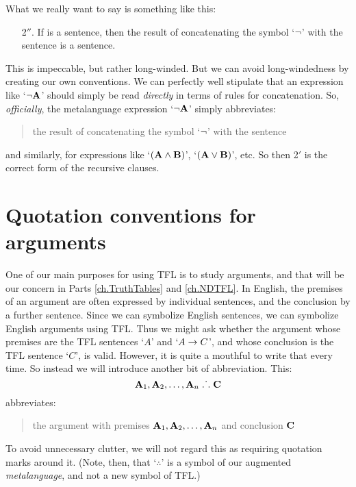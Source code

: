 What we really want to say is something like this:
	\begin{enumerate}
		\item[2$''$.] If  is a sentence, then the result of concatenating the symbol `$\neg$' with the sentence  is a sentence.
	\end{enumerate}
This is impeccable, but rather long-winded. %
But we can avoid long-windedness by creating our own conventions. We can perfectly well stipulate that an expression like `$\neg \mathbf{A}$' should simply be read \emph{directly} in terms of rules for concatenation. So, \emph{officially}, the metalanguage expression `$\neg \mathbf{A}$'
simply abbreviates:
\begin{quote}
	the result of concatenating the symbol `$\neg$' with the sentence 
\end{quote}
and similarly, for expressions like `$(\mathbf{A} \wedge \mathbf{B})$', `$(\mathbf{A} \vee \mathbf{B})$', etc. So then 2$'$ is the correct form of the recursive clauses. 


\section{Quotation conventions for arguments}
One of our main purposes for using TFL is to study arguments, and that will be our concern in Parts \ref{ch.TruthTables} and \ref{ch.NDTFL}. In English, the premises of an argument are often expressed by individual sentences, and the conclusion by a further sentence. Since we can symbolize English sentences, we can symbolize English arguments using TFL. Thus we might ask whether the argument whose premises are the TFL sentences `$A$' and `$A \rightarrow C$', and whose conclusion is the TFL sentence `$C$', is valid. However, it is quite a mouthful to write that every time. So instead we will introduce another bit of abbreviation. This:
	$$\mathbf{A}_1, \mathbf{A}_2, \ldots, \mathbf{A}_n \mathrel{\ldotp\dot{}\,\ldotp} \mathbf{C}$$
abbreviates:
	\begin{quote}
		the argument with premises $\mathbf{A}_1, \mathbf{A}_2, \ldots, \mathbf{A}_n$ and conclusion $\mathbf{C}$
	\end{quote}
To avoid unnecessary clutter, we will not regard this as requiring quotation marks around it. (Note, then, that `$\therefore$' is a symbol of our augmented \emph{metalanguage}, and not a new symbol of TFL.)
